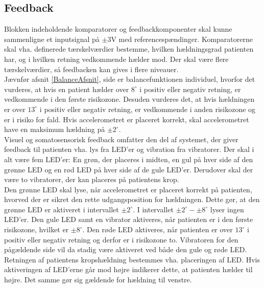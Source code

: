 \subsection{Feedback}\label{KomparatorAfs}
Blokken indeholdende komparatorer og feedbackkomponenter skal kunne sammenligne et inputsignal på $\pm3$V med referencespændinger. Komparatorerne skal vha. definerede tærskelværdier bestemme, hvilken hældningsgrad patienten har, og i hvilken retning vedkommende hælder mod. Der skal være flere tærskelværdier, så feedbacken kan gives i flere niveauer.\\
Jævnfør afsnit \ref{BalanceAfsnit}, side \pageref{BalanceAfsnit} er balancefunktionen individuel, hvorfor det vurderes, at hvis en patient hælder over $8^{\circ}$ i positiv eller negativ retning, er vedkommende i den første risikozone. Desuden vurderes det, at hvis hældningen er over $13^{\circ}$ i positiv eller negativ retning, er vedkommende i anden risikozone og er i risiko for fald. Hvis accelerometret er placeret korrekt, skal accelerometret have en maksimum hældning på $\pm2^{\circ}$. \\
Visuel og somatosensorisk feedback omfatter den del af systemet, der giver feedback til patienten vha. lys fra LED'er og vibration fra vibratorer. Der skal i alt være fem LED'er: En grøn, der placeres i midten, en gul på hver side af den grønne LED og en rød LED på hver side af de gule LED'er. Derudover skal der være to vibratorer, der kan placeres på patientens krop.\\
Den grønne LED skal lyse, når accelerometret er placeret korrekt på patienten, hvorved der er sikret den rette udgangsposition for hældningen. Dette gør, at den grønne LED er aktiveret i intervallet $\pm2^{\circ}$. I intervallet $\pm2^{\circ}-\pm8^{\circ}$ lyser ingen LED'er. Den gule LED samt en vibrator aktiveres, når patienten er i den første risikozone, hvilket er $\pm8^{\circ}$. Den røde LED aktiveres, når patienten er over $13^{\circ}$ i positiv eller negativ retning og derfor er i risikozone to. Vibratoren for den pågældende side vil da stadig være aktiveret ved både den gule og røde LED. Retningen af patientens kropshældning bestemmes vha. placeringen af LED. Hvis aktiveringen af LED'erne går mod højre indikerer dette, at patienten hælder til højre. Det samme gør sig gældende for hældning til venstre. \\
